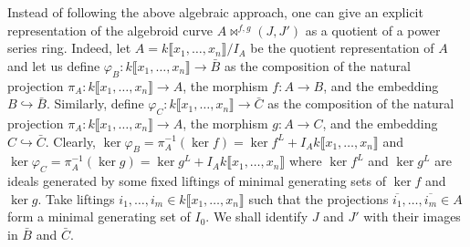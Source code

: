 \documentclass{amsart}%
\theoremstyle{plain}
\numberwithin{equation}{section}
\theoremstyle{definition}
\begin{document}
    Instead of following the above algebraic approach, one can give an explicit representation of the algebroid curve $A\bowtie^{f,g}(J,J')$ as a quotient of a power series ring. Indeed, let $A=k\llbracket x_1,\ldots ,x_n\rrbracket/I_A$ be the quotient representation of $A$ and let us define $\varphi_{B}:k\llbracket x_1,\ldots ,x_n\rrbracket\to \bar{B}$ as the composition of the natural projection $\pi_A:k\llbracket x_1,\ldots ,x_n\rrbracket\to A$, the morphism $f:A\to B$, and the embedding $B\hookrightarrow\bar{B}$. Similarly, define $\varphi_C:k\llbracket x_1,\ldots ,x_n\rrbracket\to \bar{C}$ as the composition of the natural projection $\pi_A:k\llbracket x_1,\ldots ,x_n\rrbracket\to A$, the morphism $g:A\to C$, and the embedding $C\hookrightarrow\bar{C}$. Clearly, $\ker \varphi_B=\pi_A^{-1}(\ker f)=\ker f^{L}+I_Ak\llbracket x_1,\ldots ,x_n\rrbracket$ and $\ker \varphi_C=\pi_A^{-1}(\ker g)=\ker g^{L}+I_Ak\llbracket x_1,\ldots ,x_n\rrbracket$ where $\ker f^{L}$ and $\ker g^{L}$ are ideals generated by some fixed liftings of minimal generating sets of $\ker f$ and $\ker g$. Take liftings $i_1,\ldots,i_m\in k\llbracket x_1,\ldots ,x_n\rrbracket$ such that the projections $\overline{i_1},\ldots, \overline{i_m}\in A$ form a minimal generating set of $I_0$. We shall identify $J$ and $J'$ with their images in $\bar{B}$ and $\bar{C}$.\medskip
\end{document}
